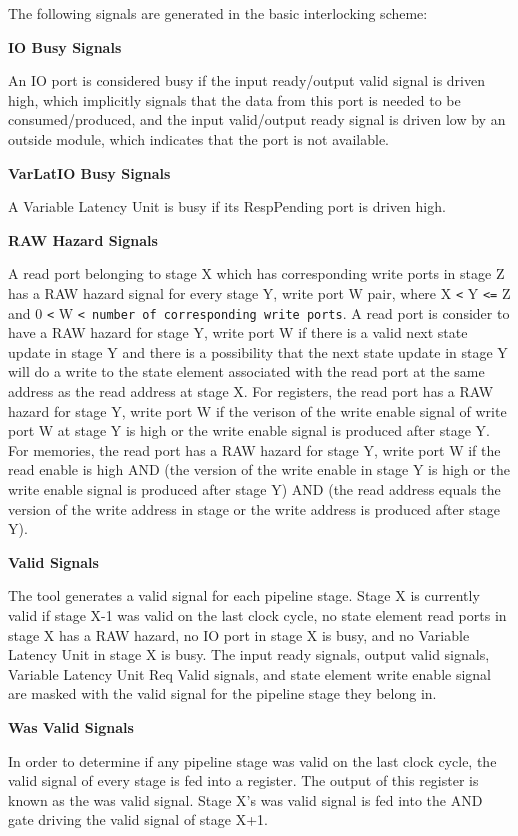 The following signals are generated in the basic interlocking scheme:

{\bf IO Busy Signals}

An IO port is considered busy if the input ready/output valid signal is driven high, which implicitly signals that the data from this port is needed to be consumed/produced, and the input valid/output ready signal is driven low by an outside module, which indicates that the port is not available.


{\bf VarLatIO Busy Signals}

A Variable Latency Unit is busy if its RespPending port is driven high.


{\bf RAW Hazard Signals}

A read port belonging to stage X which has corresponding write ports in stage Z has a RAW hazard signal for every stage Y, write port W pair, where X {\tt <} Y {\tt <=} Z and 0 {\tt <} W {\tt < number of corresponding write ports}. A read port is consider to have a RAW hazard for stage Y, write port W if there is a valid next state update in stage Y and there is a possibility that the next state update in stage Y will do a write to the state element associated with the read port at the same address as the read address at stage X. For registers, the read port has a RAW hazard for stage Y, write port W if the verison of the write enable signal of write port W at stage Y is high or the write enable signal is produced after stage Y. For memories, the read port has a RAW hazard for stage Y, write port W if the read enable is high AND (the version of the write enable in stage Y is high or the write enable signal is produced after stage Y) AND (the read address equals the version of the write address in stage or the write address is produced after stage Y).


{\bf Valid Signals}

The tool generates a valid signal for each pipeline stage. Stage X is currently valid if stage X-1 was valid on the last clock cycle, no state element read ports in stage X has a RAW hazard, no IO port in stage X is busy, and no Variable Latency Unit in stage X is busy. The input ready signals, output valid signals, Variable Latency Unit Req Valid signals, and state element write enable signal are masked with the valid signal for the pipeline stage they belong in.


{\bf Was Valid Signals}

In order to determine if any pipeline stage was valid on the last clock cycle, the valid signal of every stage is fed into a register. The output of this register is known as the was valid signal. Stage X's was valid signal is fed into the AND gate driving the valid signal of stage X+1.


